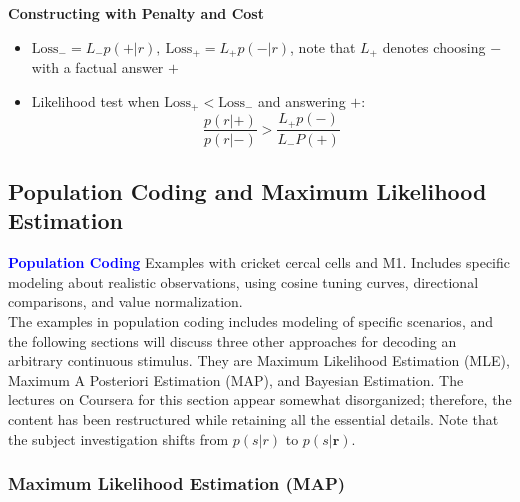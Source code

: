 \documentclass[11pt]{article}
\begin{document}
\noindent \textbf{Constructing with Penalty and Cost} 
\begin{itemize}
    \item $\text{Loss}_-=L_-p(+|r), \ \text{Loss}_+=L_+p(-|r)$, note that $L_+$ denotes choosing $-$ with a factual answer $+$
    \item Likelihood test when $\text{Loss}_+<\text{Loss}_-$ and answering $+$:
    \begin{equation*}
        \frac{p(r|+)}{p(r|-)}>\frac{L_+p(-)}{L_-P(+)}
    \end{equation*}
\end{itemize}
\subsection{Population Coding and Maximum Likelihood Estimation}
\noindent \textcolor{Blue}{\textbf{Population Coding}} Examples with cricket cercal cells and M1. Includes specific modeling about realistic observations, using cosine tuning curves, directional comparisons, and value normalization. 
\\

The examples in population coding includes modeling of specific scenarios, and the following sections will discuss three other approaches for decoding an arbitrary continuous stimulus. They are Maximum Likelihood Estimation (MLE), Maximum A Posteriori Estimation (MAP), and Bayesian Estimation. The lectures on Coursera for this section appear somewhat disorganized; therefore, the content has been restructured while retaining all the essential details. Note that the subject investigation shifts from $p(s|r)$ to $p(s|\mathbf{r})$.

\subsubsection{Maximum Likelihood Estimation (MAP)}
\end{document}
